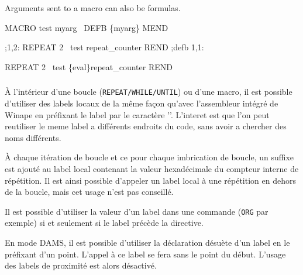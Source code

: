 \begin{xen}
Arguments sent to a macro can also be formulas. %
\end{xen}

\begin{code}
MACRO test myarg
\ DEFB \{myarg\}
MEND

;1,2:
REPEAT 2
\ test repeat\_counter
REND
;defb 1,1:

REPEAT 2
\ test \{eval\}repeat\_counter
REND
\end{code}



\subsubsection{}\label{LOCALLABELS}

\begin{xfr}
  À l'intérieur d'une boucle (\texttt{REPEAT/WHILE/UNTIL}) ou d'une macro, il est possible d'utiliser des labels locaux de la même façon qu'avec l'assembleur intégré de Winape en préfixant le label par le caractère '\at'. L'interet est que l'on peut reutiliser le meme label a différents endroits du code, sans avoir a chercher des noms différents.

  À chaque itération de boucle et ce pour chaque imbrication de boucle, un suffixe est ajouté au label local contenant la valeur hexadécimale du compteur interne de répétition. Il est ainsi possible d'appeler un label local à une répétition en dehors de la boucle, mais cet usage n'est pas conseillé.

  Il est possible d'utiliser la valeur d'un label dans une commande (\texttt{ORG} par exemple) si et seulement si le label précède la directive.

  En mode DAMS, il est possible d'utiliser la déclaration désuète d'un label en le préfixant d'un point. L'appel à ce label se fera sans le point du début. L'usage des labels de proximité est alors désactivé.

\end{xfr}

